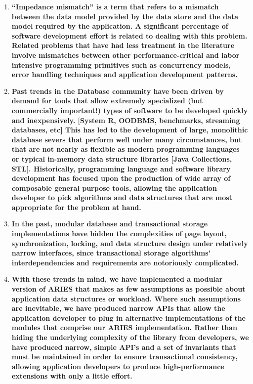 \documentclass[letterpaper,english]{article}
\begin{document}
\begin{enumerate}
\begin{enumerate}
  \item {\bf {}``Impedance mismatch'' is a term that refers to a mismatch
  between the data model provided by the data store and the data model
  required by the application. A significant percentage of software
  development effort is related to dealing with this problem. Related
  problems that have had less treatment in the literature involve
  mismatches between other performance-critical and labor intensive
  programming primitives such as concurrency models, error handling
  techniques and application development patterns.}
  \item {\bf Past trends in the Database community have been driven by
  demand for tools that allow extremely specialized (but commercially
  important!)  types of software to be developed quickly and
  inexpensively. {[}System R, OODBMS, benchmarks, streaming databases,
  etc{]} This has led to the development of large, monolithic database
  severs that perform well under many circumstances, but that are not
  nearly as flexible as modern programming languages or typical
  in-memory data structure libraries {[}Java Collections,
  STL{]}. Historically, programming language and software library
  development has focused upon the production of wide array of
  composable general purpose tools, allowing the application developer
  to pick algorithms and data structures that are most appropriate for
  the problem at hand.}

  \item {\bf In the past, modular database and transactional storage
  implementations have hidden the complexities of page layout,
  synchronization, locking, and data structure design under relatively
  narrow interfaces, since transactional storage algorithms'
  interdependencies and requirements are notoriously complicated.}

  \item {\bf With these trends in mind, we have implemented a modular
  version of ARIES that makes as few assumptions as possible about
  application data structures or workload. Where such assumptions are
  inevitable, we have produced narrow APIs that allow the application
  developer to plug in alternative implementations of the modules that
  comprise our ARIES implementation. Rather than hiding the underlying
  complexity of the library from developers, we have produced narrow,
  simple API's and a set of invariants that must be maintained in
  order to ensure transactional consistency, allowing application
  developers to produce high-performance extensions with only a little
  effort.}


\end{enumerate}
\end{enumerate}
\end{document}
